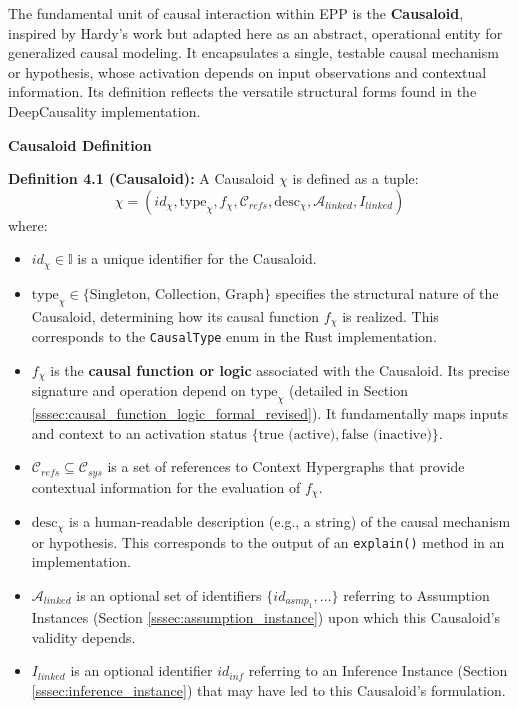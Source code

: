 The fundamental unit of causal interaction within EPP is the \textbf{Causaloid}, inspired by Hardy's work \cite{HardyDynamicCausalStructure} but adapted here as an abstract, operational entity for generalized causal modeling. It encapsulates a single, testable causal mechanism or hypothesis, whose activation depends on input observations and contextual information. Its definition reflects the versatile structural forms found in the DeepCausality implementation.

\textbf{Causaloid Definition}

    
    \textbf{Definition 4.1 (Causaloid):} A Causaloid \( \chi \) is defined as a tuple:
    \[ \chi = (id_\chi, \text{type}_\chi, f_\chi, \mathcal{C}_{refs}, \text{desc}_\chi, \mathcal{A}_{linked}, I_{linked}) \]
    where:
    \begin{itemize}
        \item \( id_\chi \in \mathbb{I} \) is a unique identifier for the Causaloid.
        \item \( \text{type}_\chi \in \{\text{Singleton, Collection, Graph}\} \) specifies the structural nature of the Causaloid, determining how its causal function \(f_\chi\) is realized. This corresponds to the \texttt{CausalType} enum in the Rust implementation.
        \item \( f_\chi \) is the \textbf{causal function or logic} associated with the Causaloid. Its precise signature and operation depend on \(\text{type}_\chi\) (detailed in Section \ref{sssec:causal_function_logic_formal_revised}). It fundamentally maps inputs and context to an activation status \(\{\text{true (active)}, \text{false (inactive)}\}\).
        \item \( \mathcal{C}_{refs} \subseteq \mathcal{C}_{sys} \) is a set of references to Context Hypergraphs that provide contextual information for the evaluation of \(f_\chi\).
        \item \( \text{desc}_\chi \) is a human-readable description (e.g., a string) of the causal mechanism or hypothesis. This corresponds to the output of an \texttt{explain()} method in an implementation.
        \item \( \mathcal{A}_{linked} \) is an optional set of identifiers \(\{id_{asmp_1}, \dots\}\) referring to Assumption Instances (Section \ref{sssec:assumption_instance}) upon which this Causaloid's validity depends.
        \item \( I_{linked} \) is an optional identifier \(id_{inf}\) referring to an Inference Instance (Section \ref{sssec:inference_instance}) that may have led to this Causaloid's formulation.
    \end{itemize}


